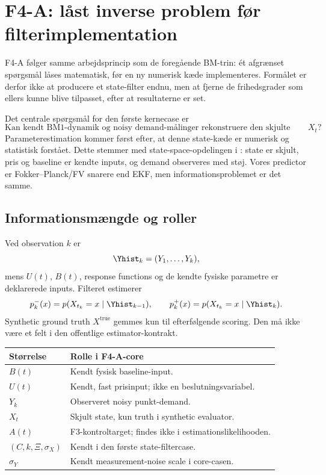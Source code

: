 \section{F4-A: låst inverse problem før filterimplementation}
\label{sec:f4a}

F4-A følger samme arbejdsprincip som de foregående BM-trin: ét afgrænset spørgsmål
låses matematisk, før en ny numerisk kæde implementeres. Formålet er derfor ikke at
producere et state-filter endnu, men at fjerne de frihedsgrader som ellers kunne blive
tilpasset, efter at resultaterne er set.

Det centrale spørgsmål for den første kernecase er
\[
 \boxed{\text{Kan kendt BM1-dynamik og noisy demand-målinger rekonstruere den skjulte state }X_t?}
\]
Parameterestimation kommer først efter, at denne state-kæde er numerisk og statistisk
forstået. Dette stemmer med state-space-opdelingen i \cite{alba}: state er skjult,
pris og baseline er kendte inputs, og demand observeres med støj. Vores predictor er
Fokker--Planck/FV snarere end EKF, men informationsproblemet er det samme.

\subsection{Informationsmængde og roller}

Ved observation \(k\) er
\[
 \Yhist_k=(Y_1,\ldots,Y_k),
\]
mens \(U(t)\), \(B(t)\), response functions og de kendte fysiske parametre er deklarerede
inputs. Filteret estimerer
\[
 p_k^-(x)=p(X_{t_k}=x\mid\Yhist_{k-1}),
 \qquad
 p_k^+(x)=p(X_{t_k}=x\mid\Yhist_k).
\]
Synthetic ground truth \(X^{\mathrm{true}}\) gemmes kun til efterfølgende scoring. Den må
ikke være et felt i den offentlige estimator-kontrakt.

\begin{center}
\begin{tabularx}{\linewidth}{@{}lX@{}}
\toprule
Størrelse & Rolle i F4-A-core\\
\midrule
\(B(t)\) & Kendt fysisk baseline-input.\\
\(U(t)\) & Kendt, fast prisinput; ikke en beslutningsvariabel.\\
\(Y_k\) & Observeret noisy punkt-demand.\\
\(X_t\) & Skjult state, kun truth i synthetic evaluator.\\
\(A(t)\) & F3-kontroltarget; findes ikke i estimationslikelihooden.\\
\((C,k,\Xi,\sigma_X)\) & Kendt i den første state-filtercase.\\
\(\sigma_Y\) & Kendt measurement-noise scale i core-casen.\\
\bottomrule
\end{tabularx}
\end{center}


